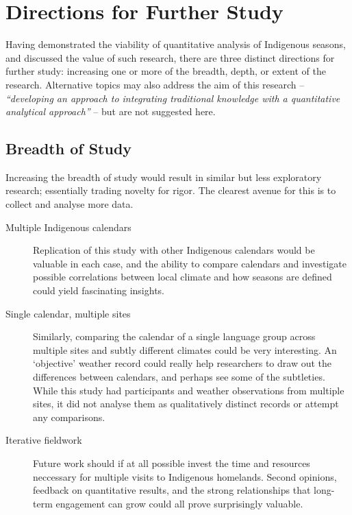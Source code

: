 \section{Directions for Further Study}
\label{sec:further-study}

Having demonstrated the viability of quantitative analysis of Indigenous
seasons, and discussed the value of such research, there are three distinct
directions for further study:  increasing one or more of the breadth, depth,
or extent of the research.  Alternative topics may also address the aim
of this research -- \textit{``developing an approach to integrating traditional
knowledge with a quantitative analytical approach''} -- but are not suggested
here.


\subsection{Breadth of Study}
Increasing the breadth of study would result in similar but less exploratory
research; essentially trading novelty for rigor.  The clearest avenue for
this is to collect and analyse more data.

\begin{description}
\item[Multiple Indigenous calendars]
    Replication of this study with other Indigenous calendars would be
    valuable in each case, and the ability to compare calendars and investigate
    possible correlations between local climate and how seasons are defined
    could yield fascinating insights.

\item[Single calendar, multiple sites]
    Similarly, comparing the calendar of a single language group across
    multiple sites and subtly different climates could be very interesting.
    An `objective' weather record could really help researchers to draw out
    the differences between calendars, and perhaps see some of the subtleties.
    While this study had participants and weather observations from multiple
    sites, it did not analyse them as qualitatively distinct records or
    attempt any comparisons.

\item[Iterative fieldwork]
    Future work should if at all possible invest the time and resources
    neccessary for multiple visits to Indigenous homelands.  Second opinions,
    feedback on quantitative results, and the strong relationships that
    long-term engagement can grow could all prove surprisingly valuable.
\end{description}

